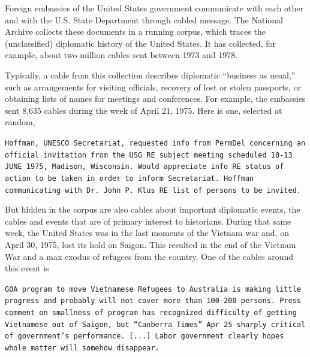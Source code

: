 
Foreign embassies of the United States government communicate with
each other and with the U.S. State Department through cabled message.
The National Archive collects these documents in a running corpus,
which traces the (unclassified) diplomatic history of the United
States. It has collected, for example, about two
million cables sent between 1973 and 1978.

Typically, a cable from this collection describes diplomatic ``business as usual,'' such as arrangements for visiting officials, recovery of lost or stolen passports, or obtaining lists of names for meetings and conferences. For example,
the embassies sent 8,635 cables during the week of April 21, 1975. Here is one,
selected at random,
\begin{shaded*} \tt{Hoffman, UNESCO Secretariat, requested info from
PermDel concerning an official invitation from the USG
RE subject meeting scheduled 10-13 JUNE 1975, Madison,
Wisconsin.  Would appreciate info RE status of action to 
be taken in order to inform Secretariat.  Hoffman communicating 
with Dr.~John P.~Klus RE list of persons to be invited.}
\end{shaded*}

But hidden in the corpus are also cables about important diplomatic
events, the cables and events that are of primary interest to
historians. During that same week, the United States was in the last
moments of the Vietnam war and, on April 30, 1975, lost its hold on Saigon. This resulted in the end of the Vietnam War and a max exodus of refugees from the country.  One
of the cables around this event is
\begin{shaded*}
  \tt{GOA program to move Vietnamese Refugees to Australia
  is making little progress and probably will not cover more than
  100-200 persons.  Press comment on smallness of program has
  recognized difficulty of getting Vietnamese out of Saigon, but
  ``Canberra Times'' Apr 25 sharply critical of government's
  performance.  [...]
  Labor government clearly hopes whole
  matter will somehow disappear.}
\end{shaded*}

